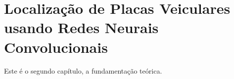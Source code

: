 
\chapter{Localização de Placas Veiculares usando Redes Neurais Convolucionais}

Este \'e o segundo cap\'itulo, a fundamenta\c{c}\~ao te\'orica.
